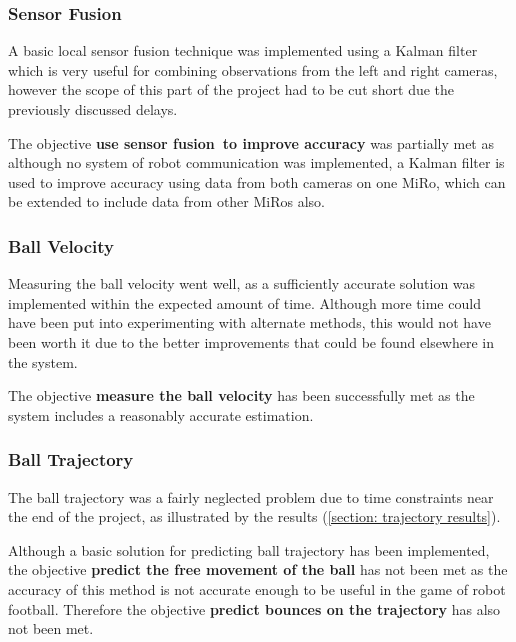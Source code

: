 \subsubsection{Sensor Fusion}

A basic local sensor fusion technique was implemented using a Kalman filter which is very useful for combining observations from the left and right cameras, however the scope of this part of the project had to be cut short due the previously discussed delays. 

The objective \textbf{use sensor fusion\ to improve accuracy} was partially met as although no system of robot communication was implemented, a Kalman filter is used to improve accuracy using data from both cameras on one MiRo, which can be extended to include data from other MiRos also. 

\subsubsection{Ball Velocity}

Measuring the ball velocity went well, as a sufficiently accurate solution was implemented within the expected amount of time. Although more time could have been put into experimenting with alternate methods, this would not have been worth it due to the better improvements that could be found elsewhere in the system. 

The objective \textbf{measure the ball velocity} has been successfully met as the system includes a reasonably accurate estimation. 

\subsubsection{Ball Trajectory}

The ball trajectory was a fairly neglected problem due to time constraints near the end of the project, as illustrated by the results (\ref{section: trajectory results}). 

Although a basic solution for predicting ball trajectory has been implemented, the objective \textbf{predict the free movement of the ball} has not been met as the accuracy of this method is not accurate enough to be useful in the game of robot football. Therefore the objective \textbf{predict bounces on the trajectory} has also not been met. 


